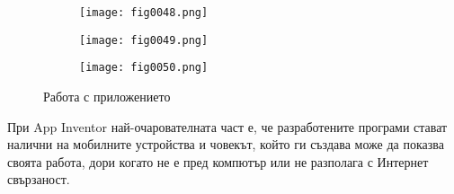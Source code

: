 \begin{figure}[H]
  \begin{subfigure}{0.31\textwidth}
  \texttt{[image: fig0048.png]}
  \label{fig0048}
  \end{subfigure}
  \begin{subfigure}{0.31\textwidth}
  \texttt{[image: fig0049.png]}
  \label{fig0049}
  \end{subfigure}
  \begin{subfigure}{0.31\textwidth}
  \texttt{[image: fig0050.png]}
  \label{fig0050}
  \end{subfigure}
  \caption{Работа с приложението}
\end{figure}

При App Inventor най-очарователната част е, че разработените програми стават налични на мобилните устройства и човекът, който ги създава може да показва своята работа, дори когато не е пред компютър или не разполага с Интернет свързаност. 

